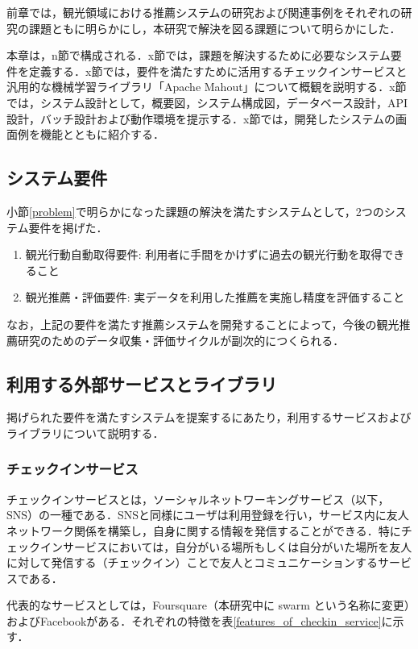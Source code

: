 \documentclass{jsarticle}
\begin{document}
前章では，観光領域における推薦システムの研究および関連事例をそれぞれの研究の課題ともに明らかにし，本研究で解決を図る課題について明らかにした．

本章は，n節で構成される．x節では，課題を解決するために必要なシステム要件を定義する．x節では，要件を満たすために活用するチェックインサービスと汎用的な機械学習ライブラリ「Apache Mahout」について概観を説明する．x節では，システム設計として，概要図，システム構成図，データベース設計，API設計，バッチ設計および動作環境を提示する．x節では，開発したシステムの画面例を機能とともに紹介する．

\subsection{システム要件}

小節\ref{problem}で明らかになった課題の解決を満たすシステムとして，2つのシステム要件を掲げた．

\begin{enumerate}
\item 観光行動自動取得要件: 利用者に手間をかけずに過去の観光行動を取得できること
\item 観光推薦・評価要件: 実データを利用した推薦を実施し精度を評価すること
\end{enumerate}

なお，上記の要件を満たす推薦システムを開発することによって，今後の観光推薦研究のためのデータ収集・評価サイクルが副次的につくられる．

\subsection{利用する外部サービスとライブラリ}

掲げられた要件を満たすシステムを提案するにあたり，利用するサービスおよびライブラリについて説明する．

\subsubsection{チェックインサービス}

チェックインサービスとは，ソーシャルネットワーキングサービス（以下，SNS）の一種である．SNSと同様にユーザは利用登録を行い，サービス内に友人ネットワーク関係を構築し，自身に関する情報を発信することができる．特にチェックインサービスにおいては，自分がいる場所もしくは自分がいた場所を友人に対して発信する（チェックイン）ことで友人とコミュニケーションするサービスである．

代表的なサービスとしては，Foursquare（本研究中に swarm という名称に変更）およびFacebookがある．それぞれの特徴を表\ref{features_of_checkin_service}に示す．
\end{document}
